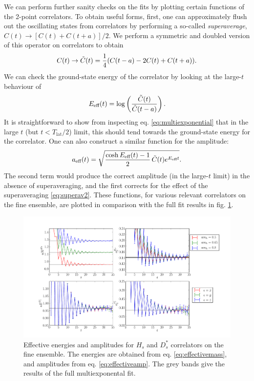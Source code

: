 We can perform further sanity checks on the fits by plotting certain functions of the 2-point correlators. To obtain useful forms, first, one can approximately flush out the oscillating states from correlators by performing a so-called {\it{superaverage}}, $C(t) \to [ C(t) + C(t+a) ]/2$. We perform a symmetric and doubled version of this operator on correlators to obtain
\begin{align}
  C(t) \to \tilde{C}(t) = {1\over 4}( C(t-a) - 2C(t) + C(t+a) ).
  \label{eq:superav2}
\end{align}
We can check the ground-state energy of the correlator by looking at the large-$t$ behaviour of
\begin{align}
  E_{\text{eff}}(t) = \log\left({ \tilde{C}(t)\over \tilde{C}(t-a) }\right).
  \label{eq:effectivemass}
\end{align}
It is straightforward to show from inspecting eq. \eqref{eq:multiexponential} that in the large $t$ (but $t < T_{\text{lat}}/2$) limit, this should tend towards the ground-state energy for the correlator. One can also construct a similar function for the amplitude:
\begin{align}
  a_{\text{eff}}(t) = \sqrt{{\cosh E_{\text{eff}}(t)-1\over 2} \,\tilde{C}(t) e^{E_{\text{eff}}t} }.
  \label{eq:effectiveamp}
\end{align}
The second term would produce the correct amplitude (in the large-$t$ limit) in the absence of superaveraging, and the first corrects for the effect of the superaveraging \eqref{eq:superav2}. These functions, for various relevant correlators on the fine ensemble, are plotted in comparison with the full fit results in fig. \ref{fig:2pt-summary_BsDsstar}.

\begin{figure}[htb!]
  \begin{center}
  \includegraphics[width=1.1\textwidth]{images/BsDsstar/2ptsummary_fine.pdf}
  \caption{Effective energies and amplitudes for $H_s$ and $D_s^*$ correlators on the fine ensemble. The energies are obtained from eq. \eqref{eq:effectivemass}, and amplitudes from eq. \eqref{eq:effectiveamp}. The grey bands give the results of the full multiexponental fit. \label{fig:2pt-summary_BsDsstar}}
  \end{center}
\end{figure}

